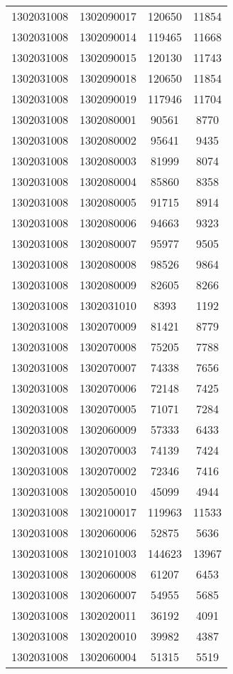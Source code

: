 \begin{longtable}{llcc}
1302031008 & 1302090017 & 120650 & 11854\\
1302031008 & 1302090014 & 119465 & 11668\\
1302031008 & 1302090015 & 120130 & 11743\\
1302031008 & 1302090018 & 120650 & 11854\\
1302031008 & 1302090019 & 117946 & 11704\\
1302031008 & 1302080001 & 90561 & 8770\\
1302031008 & 1302080002 & 95641 & 9435\\
1302031008 & 1302080003 & 81999 & 8074\\
1302031008 & 1302080004 & 85860 & 8358\\
1302031008 & 1302080005 & 91715 & 8914\\
1302031008 & 1302080006 & 94663 & 9323\\
1302031008 & 1302080007 & 95977 & 9505\\
1302031008 & 1302080008 & 98526 & 9864\\
1302031008 & 1302080009 & 82605 & 8266\\
1302031008 & 1302031010 & 8393 & 1192\\
1302031008 & 1302070009 & 81421 & 8779\\
1302031008 & 1302070008 & 75205 & 7788\\
1302031008 & 1302070007 & 74338 & 7656\\
1302031008 & 1302070006 & 72148 & 7425\\
1302031008 & 1302070005 & 71071 & 7284\\
1302031008 & 1302060009 & 57333 & 6433\\
1302031008 & 1302070003 & 74139 & 7424\\
1302031008 & 1302070002 & 72346 & 7416\\
1302031008 & 1302050010 & 45099 & 4944\\
1302031008 & 1302100017 & 119963 & 11533\\
1302031008 & 1302060006 & 52875 & 5636\\
1302031008 & 1302101003 & 144623 & 13967\\
1302031008 & 1302060008 & 61207 & 6453\\
1302031008 & 1302060007 & 54955 & 5685\\
1302031008 & 1302020011 & 36192 & 4091\\
1302031008 & 1302020010 & 39982 & 4387\\
1302031008 & 1302060004 & 51315 & 5519\\

\end{longtable}
